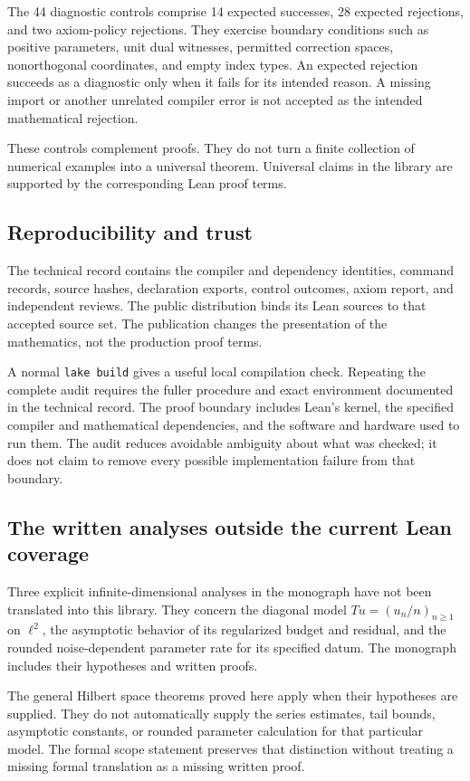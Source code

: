 \documentclass[11pt]{article}
\newcommand{\leanname}[1]{{\small\ttfamily\nolinkurl{#1}}}
\begin{document}
The 44 diagnostic controls comprise 14 expected successes, 28 expected rejections, and two axiom-policy rejections. They exercise boundary conditions such as positive parameters, unit dual witnesses, permitted correction spaces, nonorthogonal coordinates, and empty index types. An expected rejection succeeds as a diagnostic only when it fails for its intended reason. A missing import or another unrelated compiler error is not accepted as the intended mathematical rejection.

These controls complement proofs. They do not turn a finite collection of numerical examples into a universal theorem. Universal claims in the library are supported by the corresponding Lean proof terms.

\subsection{Reproducibility and trust}
The technical record contains the compiler and dependency identities, command records, source hashes, declaration exports, control outcomes, axiom report, and independent reviews. The public distribution binds its Lean sources to that accepted source set. The publication changes the presentation of the mathematics, not the production proof terms.

A normal \leanname{lake build} gives a useful local compilation check. Repeating the complete audit requires the fuller procedure and exact environment documented in the technical record. The proof boundary includes Lean's kernel, the specified compiler and mathematical dependencies, and the software and hardware used to run them. The audit reduces avoidable ambiguity about what was checked; it does not claim to remove every possible implementation failure from that boundary.

\subsection{The written analyses outside the current Lean coverage}
Three explicit infinite-dimensional analyses in the monograph have not been translated into this library. They concern the diagonal model $Tu=(u_n/n)_{n\ge1}$ on $\ell^2$, the asymptotic behavior of its regularized budget and residual, and the rounded noise-dependent parameter rate for its specified datum. The monograph includes their hypotheses and written proofs.

The general Hilbert space theorems proved here apply when their hypotheses are supplied. They do not automatically supply the series estimates, tail bounds, asymptotic constants, or rounded parameter calculation for that particular model. The formal scope statement preserves that distinction without treating a missing formal translation as a missing written proof.
\end{document}
